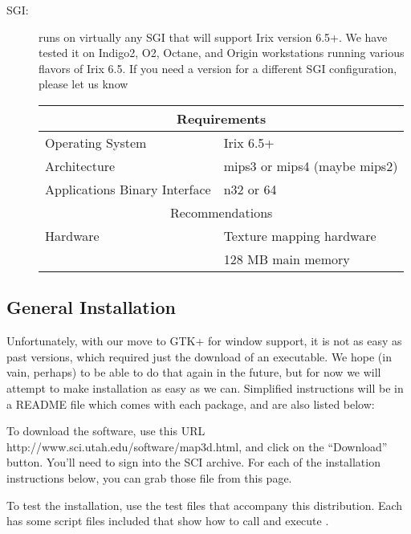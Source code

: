 \begin{description}
   \item [SGI: ] \map{} runs on virtually any SGI that will support Irix
          version 6.5+.  We have tested it on Indigo2, O2, Octane, and
          Origin workstations running various flavors of Irix 6.5.  If
          you need a version for a different SGI configuration, please let
          us know
          \\
          \begin{center}
          \begin{tabular}{|l|l|} \hline
            \multicolumn{2}{|c|}{Requirements} \\ \hline
              Operating System & Irix 6.5+\\
              Architecture & mips3 or mips4 (maybe mips2)\\
              Applications Binary Interface  &  n32 or 64\\
              \hline
            \multicolumn{2}{|c|}{Recommendations} \\ \hline
            Hardware & Texture mapping hardware\\
            & 128 MB main memory \\ \hline
          \end{tabular}
          \end{center}

  \end{description}
  
\subsection{General Installation}

Unfortunately, with our move to GTK+ for window support, it is not as easy
as past versions, which required just the download of an executable.  We
hope (in vain, perhaps) to be able to do that again in the future, but for
now we will attempt to make installation as easy as we can.  Simplified
instructions will be in a README file which comes with each package, and
are also listed below:

To download the software, use this URL
{http://www.sci.utah.edu/software/map3d.html}, and click on the
``Download'' button.  You'll need to sign into the SCI archive.  For
each of the installation instructions below, you can grab those file
from this page.


To test the installation, use the test files that accompany this
distribution.  Each has some script files included that show how to call
and execute \map{}.

